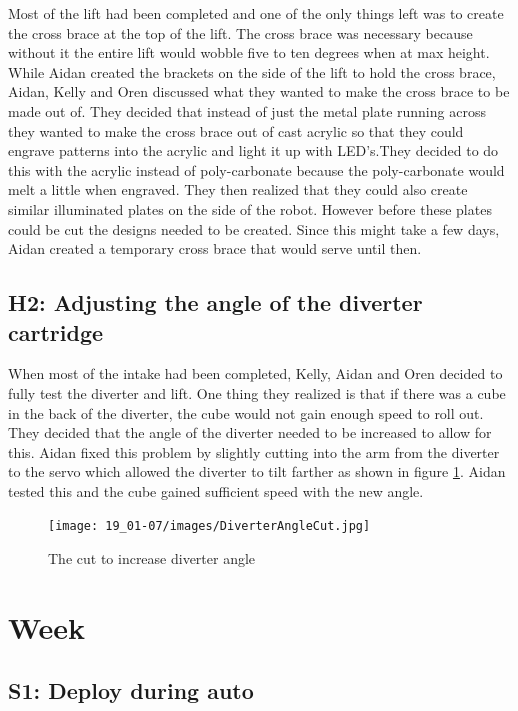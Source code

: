\documentclass{article}
\begin{document}
Most of the lift had been completed and one of the only things left was to create the cross brace at the top of the lift. The cross brace was necessary because without it the entire lift would wobble five to ten degrees when at max height. While Aidan created the brackets on the side of the lift to hold the cross brace, Aidan, Kelly and Oren discussed what they wanted to make the cross brace to be made out of. They decided that instead of just the metal plate running across they wanted to make the cross brace out of cast acrylic so that they could engrave patterns into the acrylic and light it up with LED's.They decided to do this with the acrylic instead of poly-carbonate because the poly-carbonate would melt a little when engraved. They then realized that they could also create similar illuminated plates on the side of the robot. However before these plates could be cut the designs needed to be created. Since this might take a few days, Aidan created a temporary cross brace that would serve until then.

\subsection{H2: Adjusting the angle of the diverter cartridge}

When most of the intake had been completed, Kelly, Aidan and Oren decided to fully test the diverter and lift. One thing they realized is that if there was a cube in the back of the diverter, the cube would not gain enough speed to roll out. They decided that the angle of the diverter needed to be increased to allow for this. Aidan fixed this problem by slightly cutting into the arm from the diverter to the servo which allowed the diverter to tilt farther as shown in figure \ref{fig:Cutout}. Aidan tested this and the cube gained sufficient speed with the new angle.

\begin{figure}
    \centering
    \texttt{[image: 19\_01-07/images/DiverterAngleCut.jpg]}
    \caption{The cut to increase diverter angle}
    \label{fig:Cutout}
\end{figure}
\clearpage \newpage \section{Week \thesection} 
\subsection{S1: Deploy during auto}
\end{document}
